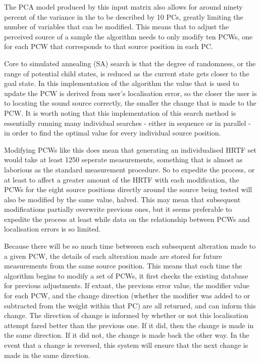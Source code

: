 The PCA model produced by this input matrix also allows for around ninety percent of the variance in the to be described by 10 PCs, greatly limiting the number of variables that can be modified. This means that to adjust the perceived source of a sample the algorithm needs to only modify ten PCWs, one for each PCW that corresponds to that source position in each PC. 

Core to simulated annealing (SA) search is that the degree of randomness, or the range of potential child states, is reduced as the current state gets closer to the goal state. In this implementation of the algorithm the value that is used to update the PCW is derived from user's localisation error, so the closer the user is to locating the sound source correctly, the smaller the change that is made to the PCW. It is worth noting that this implementation of this search method is essentially running many individual searches - either in sequence or in parallel - in order to find the optimal value for every individual source position. 

Modifying PCWs like this does mean that generating an individualised HRTF set would take at least 1250 seperate measurements, something that is almost as laborious as the standard measurement procedure. So to expedite the process, or at least to affect a greater amount of the HRTF with each modification, the PCWs for the eight source positions directly around the source being tested will also be modified by the same value, halved. This may mean that subsequent modifications partially overwrite previous ones, but it seems preferable to expedite the process at least while data on the relationship between PCWs and localisation errors is so limited. 

Because there will be so much time betweeen each subsequent alteration made to a given PCW, the details of each alteration made are stored for future measurements from the same source position. This means that each time the algorithm begins to modify a set of PCWs, it first checks the existing database for previous adjustments. If extant, the previous error value, the modifier value for each PCW, and the change direction (whether the modifier was added to or subtracted from the weight within that PC) are all returned, and can inform this change. The direction of change is informed by whether or not this localisation attempt fared better than the previous one. If it did, then the change is made in the same direction. If it did not, the change is made back the other way. In the event that a change is reversed, this system will ensure that the next change is made in the same direction. 

